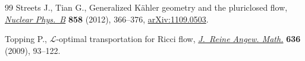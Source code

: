 \documentclass[11pt]{article}
\numberwithin{equation}{section}
\numberwithin{equation}{section}
\begin{document}
\begin{thebibliography}{99}
Streets J., Tian G., Generalized {K}\"ahler geometry and the pluriclosed flow,
 \href{https://doi.org/10.1016/j.nuclphysb.2012.01.008}{\textit{Nuclear Phys.~B}} \textbf{858} (2012), 366--376, \href{https://arxiv.org/abs/1109.0503}{arXiv:1109.0503}.

Topping P., {$\mathcal L$}-optimal transportation for {R}icci flow,
 \href{https://doi.org/10.1515/CRELLE.2009.083}{\textit{J.~Reine Angew. Math.}} \textbf{636} (2009), 93--122.

\end{thebibliography}
\end{document}
